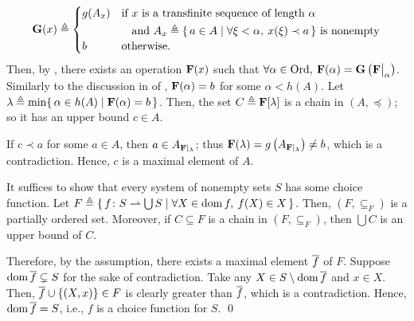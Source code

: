 \documentclass[../introduction_to_set_theory_Note.tex]{subfiles}
\begin{document}
{\begin{itemize}[nolistsep, wide=0pt, widest={(\(\Rightarrow\))}, leftmargin=*, listparindent=\parindent]
        \[
        \bm{\mathrm{G}}(x) \triangleq \begin{cases}
            g(A_{x}) & \text{if}~\begin{aligned}[t]
                &x~\text{is a transfinite sequence of length}~\alpha \\
                &\text{and}~A_{x} \triangleq \{\,a \in A \mid \forall \xi < \alpha,\: x(\xi) \prec a\,\}~
                \text{is nonempty}
            \end{aligned} \\
            b & \text{otherwise.}
        \end{cases}
    \]
    Then, by ,
    there exists an operation \(\bm{\mathrm{F}}(x)\) such that
    \(\fall \alpha \in \Ord,\: \mbf{F}(\alpha) = \mbf{G}\left(\restr{\mbf{F}}{\alpha}\right)\).
    Similarly to the discussion in  of ,
    \(\bm{\mathrm{F}}(\alpha) = b\) for some \(\alpha < h(A)\).
    Let \(\lambda \triangleq \min \{\,\alpha \in h(A) \mid \bm{\mathrm{F}}(\alpha) = b\,\}\).
    Then, the set \(C \triangleq \bm{\mathrm{F}}[\lambda]\) is a chain in \((A, \preceq)\);
    so it has an upper bound \(c \in A\).

    If \(c \prec a\) for some \(a \in A\),
    then \(a \in A_{\bm{\mathrm{F}} |_\lambda}\);
    thus \(\bm{\mathrm{F}}(\lambda) = g\left(A_{\bm{\mathrm{F}} |_\lambda}\right) \neq b\),
    which is a contradiction.
    Hence, \(c\) is a maximal element of \(A\).

    \ii[(\(\Leftarrow\))]
    It suffices to show that every system of nonempty sets \(S\)
    has some choice function.
    Let \(F \triangleq \{\,f \colon S \rightharpoonup \bigcup S \mid \forall X \in \operatorname{dom} f,\: f(X) \in X\,\}\).
    Then, \((F, \subseteq_F)\) is a partially ordered set.
    Moreover, if \(C \subseteq F\) is a chain in \((F, \subseteq_{F})\),
    then \(\bigcup C\) is an upper bound of \(C\).

    Therefore, by the assumption, there exists a maximal element \(\overline{f}\) of \(F\).
    Suppose \(\operatorname{dom} \overline{f} \subsetneq S\) for the sake of contradiction.
    Take any \(X \in S \setminus \operatorname{dom} \overline{f}\) and \(x \in X\).
    Then, \(\overline{f} \cup \{(X, x)\} \in F\) is clearly greater than \(\overline{f}\),
    which is a contradiction.
    Hence, \(\operatorname{dom} \overline{f} = S\), i.e., \(f\) is a choice function for \(S\).
    \qed
\end{itemize}
}
\end{document}
